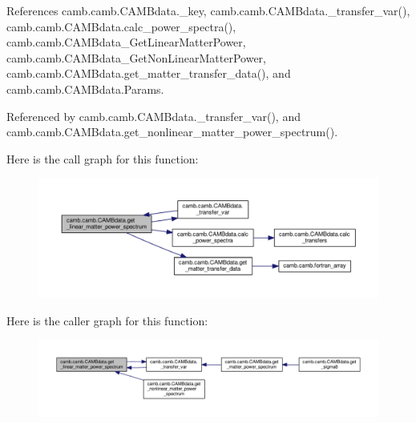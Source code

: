 References camb.\+camb.\+C\+A\+M\+Bdata.\+\_\+key, camb.\+camb.\+C\+A\+M\+Bdata.\+\_\+transfer\+\_\+var(), camb.\+camb.\+C\+A\+M\+Bdata.\+calc\+\_\+power\+\_\+spectra(), camb.\+camb.\+C\+A\+M\+Bdata\+\_\+\+Get\+Linear\+Matter\+Power, camb.\+camb.\+C\+A\+M\+Bdata\+\_\+\+Get\+Non\+Linear\+Matter\+Power, camb.\+camb.\+C\+A\+M\+Bdata.\+get\+\_\+matter\+\_\+transfer\+\_\+data(), and camb.\+camb.\+C\+A\+M\+Bdata.\+Params.



Referenced by camb.\+camb.\+C\+A\+M\+Bdata.\+\_\+transfer\+\_\+var(), and camb.\+camb.\+C\+A\+M\+Bdata.\+get\+\_\+nonlinear\+\_\+matter\+\_\+power\+\_\+spectrum().

Here is the call graph for this function\+:
\nopagebreak
\begin{figure}[H]
\begin{center}
\leavevmode
\includegraphics[width=350pt]{classcamb_1_1camb_1_1CAMBdata_a6bd8c498d329e23ebefc55648ad59ab2_cgraph}
\end{center}
\end{figure}
Here is the caller graph for this function\+:
\nopagebreak
\begin{figure}[H]
\begin{center}
\leavevmode
\includegraphics[width=350pt]{classcamb_1_1camb_1_1CAMBdata_a6bd8c498d329e23ebefc55648ad59ab2_icgraph}
\end{center}
\end{figure}
\mbox{\label{classcamb_1_1camb_1_1CAMBdata_ab18c1f8670933c20948c80ecf6d89fbf}} 
